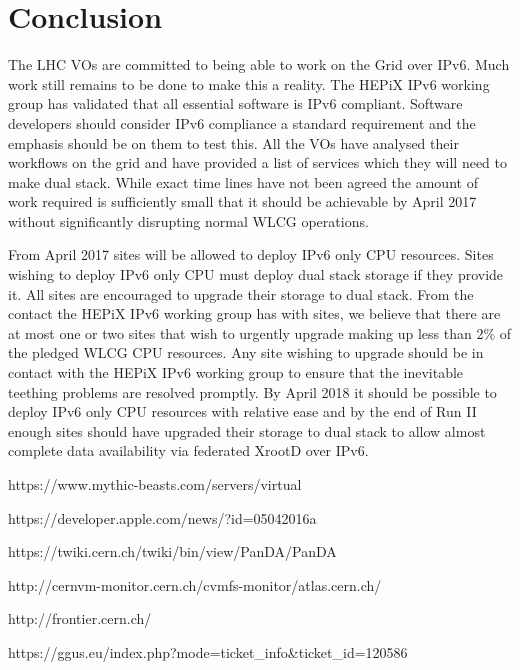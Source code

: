 \documentclass[11pt]{article}
\begin{document}
\section{Conclusion}
The LHC VOs are committed to being able to work on the Grid over IPv6.  Much work still remains to be done to make this a reality.  The HEPiX IPv6 working group has validated that all essential software is IPv6 compliant.  Software developers should consider IPv6 compliance a standard requirement and the emphasis should be on them to test this.  All the VOs have analysed their workflows on the grid and have provided a list of services which they will need to make dual stack.  While exact time lines have not been agreed the amount of work required is sufficiently small that it should be achievable by April 2017 without significantly disrupting normal WLCG operations.

From April 2017 sites will be allowed to deploy IPv6 only CPU resources. Sites wishing to deploy IPv6 only CPU must deploy dual stack storage if they provide it.  All sites are encouraged to upgrade their storage to dual stack.  From the contact the HEPiX IPv6 working group has with sites, we believe that there are at most one or two sites that wish to urgently upgrade making up less than $2\%$ of the pledged WLCG CPU resources.  Any site wishing to upgrade should be in contact with the HEPiX IPv6 working group to ensure that the inevitable teething problems are resolved promptly.  By April 2018 it should be possible to deploy IPv6 only CPU resources with relative ease and by the end of Run II enough sites should have upgraded their storage to dual stack to allow almost complete data availability via federated XrootD over IPv6. 


\begin{thebibliography}{99}

 https://www.mythic-beasts.com/servers/virtual

 https://developer.apple.com/news/?id=05042016a

 https://twiki.cern.ch/twiki/bin/view/PanDA/PanDA

 http://cernvm-monitor.cern.ch/cvmfs-monitor/atlas.cern.ch/

 http://frontier.cern.ch/

 https://ggus.eu/index.php?mode=ticket\_info\&ticket\_id=120586

\end{thebibliography}
\end{document}
